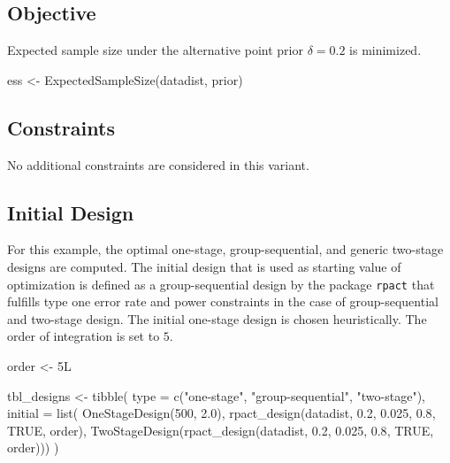\documentclass[
]{book}
\newenvironment{Shaded}{\begin{snugshade}}{\end{snugshade}}
\newcommand{\AttributeTok}[1]{\textcolor[rgb]{0.77,0.63,0.00}{#1}}
\newcommand{\ConstantTok}[1]{\textcolor[rgb]{0.00,0.00,0.00}{#1}}
\newcommand{\DecValTok}[1]{\textcolor[rgb]{0.00,0.00,0.81}{#1}}
\newcommand{\FloatTok}[1]{\textcolor[rgb]{0.00,0.00,0.81}{#1}}
\newcommand{\FunctionTok}[1]{\textcolor[rgb]{0.00,0.00,0.00}{#1}}
\newcommand{\NormalTok}[1]{#1}
\newcommand{\OtherTok}[1]{\textcolor[rgb]{0.56,0.35,0.01}{#1}}
\newcommand{\StringTok}[1]{\textcolor[rgb]{0.31,0.60,0.02}{#1}}
\begin{document}
\hypertarget{objective-7}{%
\subsection{Objective}\label{objective-7}}

Expected sample size under the alternative point prior \(\delta = 0.2\)
is minimized.

\begin{Shaded}
\begin{Highlighting}[]
\NormalTok{ess }\OtherTok{\textless{}{-}} \FunctionTok{ExpectedSampleSize}\NormalTok{(datadist, prior)}
\end{Highlighting}
\end{Shaded}

\hypertarget{constraints-7}{%
\subsection{Constraints}\label{constraints-7}}

No additional constraints are considered in this variant.

\hypertarget{initial-design-5}{%
\subsection{Initial Design}\label{initial-design-5}}

For this example, the optimal one-stage, group-sequential, and generic
two-stage designs are computed.
The initial design that is used as starting value of optimization is defined
as a group-sequential design by the package \texttt{rpact} that fulfills
type one error rate and power constraints in the case of group-sequential and
two-stage design.
The initial one-stage design is chosen heuristically.
The order of integration is set to \(5\).

\begin{Shaded}
\begin{Highlighting}[]
\NormalTok{order }\OtherTok{\textless{}{-}}\NormalTok{ 5L }

\NormalTok{tbl\_designs }\OtherTok{\textless{}{-}} \FunctionTok{tibble}\NormalTok{(}
    \AttributeTok{type    =} \FunctionTok{c}\NormalTok{(}\StringTok{"one{-}stage"}\NormalTok{, }\StringTok{"group{-}sequential"}\NormalTok{, }\StringTok{"two{-}stage"}\NormalTok{),}
    \AttributeTok{initial =} \FunctionTok{list}\NormalTok{(}
        \FunctionTok{OneStageDesign}\NormalTok{(}\DecValTok{500}\NormalTok{, }\FloatTok{2.0}\NormalTok{),}
        \FunctionTok{rpact\_design}\NormalTok{(datadist, }\FloatTok{0.2}\NormalTok{, }\FloatTok{0.025}\NormalTok{, }\FloatTok{0.8}\NormalTok{, }\ConstantTok{TRUE}\NormalTok{, order),}
        \FunctionTok{TwoStageDesign}\NormalTok{(}\FunctionTok{rpact\_design}\NormalTok{(datadist, }\FloatTok{0.2}\NormalTok{, }\FloatTok{0.025}\NormalTok{, }\FloatTok{0.8}\NormalTok{, }\ConstantTok{TRUE}\NormalTok{, order))) )}
\end{Highlighting}
\end{Shaded}
\end{document}
